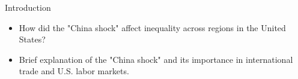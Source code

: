 \begin{frame}{Introduction}
    \begin{itemize}
        \item How did the "China shock" affect inequality across regions in the United States?
        \item Brief explanation of the "China shock" and its importance in international trade and U.S. labor markets.
    \end{itemize}
\end{frame}